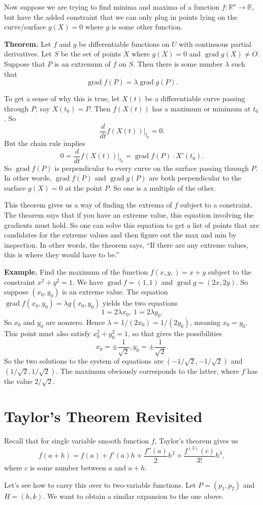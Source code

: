 \documentclass{article}
\DeclareMathOperator{\grd}{grad}
\begin{document}
Now suppose we are trying to find minima and maxima of a function
$f:\mathbb{R}^n \to \mathbb{R}$, but have the added constraint
that we can only plug in points lying on the curve/surface $g(X)=0$
where $g$ is some other function.

\textbf{Theorem.} Let $f$ and $g$ be differentiable functions on $U$ with
continuous partial derivatives. Let $S$ be the set of points $X$
where $g(X)=0$ and $\grd g(X) \neq O$. Suppose that $P$ is 
an extremum of $f$ on $S$. Then there is some number $\lambda$ such that
\[\grd f(P) = \lambda \grd g(P).\]

To get a sense of why this is true, let $X(t)$ be a 
differentiable curve passing through $P$, say $X(t_0)=P$.
Then $f(X(t))$ has a maximum or minimum at $t_0$. So 
\[\frac{d}{dt} f(X(t)) \bigg\vert_{t_0} =0.\]
But the chain rule implies
\[0=\frac{d}{dt} f(X(t)) \bigg\vert_{t_0} = \grd f(P) \cdot X'(t_0).\]
So $\grd f(P)$ is perpendicular to every curve on the surface
passing through $P$. In other words, $\grd f(P)$ and $\grd g(P)$
are both perpendicular to the surface $g(X)=0$ at the point $P$.
So one is a multiple of the other.

This theorem gives us a way of finding the extrema of $f$ subject to
a constraint. The theorem says that if you have an extreme value,
this equation involving the gradients must hold. So one can solve this equation
to get a list of points that are candidates for the extreme values and then figure out the
max and min by inspection. In other words, the theorem says, 
``If there are any extreme values, this is where they would have to be.''

\textbf{Example.} Find the maximum of the function $f(x,y,)=x+y$
subject to the constraint $x^2 + y^2 = 1$. We have $\grd f = (1,1)$
and $\grd g = (2x,2y)$. So suppose $(x_0,y_0)$ is an extreme value.
The equation $\grd f(x_0,y_0)  = \lambda g(x_0,y_0)$ yields the 
two equations
\[1=2\lambda x_0,\ 1 = 2\lambda y_0.\]
So $x_0$ and $y_0$ are nonzero. Hence $\lambda = 1/(2x_0) = 1/(2y_0)$,
meaning $x_0 = y_0$. This point must also satisfy $x_0^2 + y_0^2 = 1$,
so that gives the possibilities 
\[x_0 = \pm \frac{1}{\sqrt{2}}, y_0 = \pm \frac{1}{\sqrt{2}}.\]
So the two solutions to the system of equations are $(-1/\sqrt{2},-1/\sqrt{2})$
and $(1/\sqrt{2},1/\sqrt{2})$. The maximum obviously corresponds to the
latter, where $f$ has the value $2/\sqrt{2}$.

\section*{Taylor's Theorem Revisited}

Recall that for single variable smooth function $f$, Taylor's theorem gives us 
\[f(a+h) = f(a) + f'(a)h + \frac{f''(a)}{2} h^2 + \frac{f^{(3)}(c)}{3!}h^3,\]
where $c$ is some number between $a$ and $a+h$.

Let's see how to carry this over to two-variable functions. Let $P=(p_1,p_2)$ and $H=(h,k)$.
We want to obtain a similar expansion to the one above.
\end{document}

